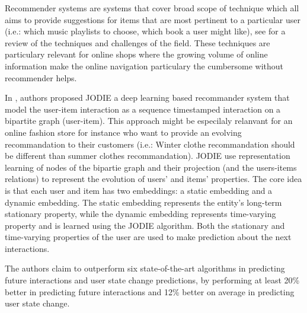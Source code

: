 {\color{red} Recommender systems are systems that cover broad scope of technique which all aims to provide suggestions for items that are most pertinent to a particular user (i.e.: which music playlists to choose, which book a user might like), see \cite{Ricci_Rokach_Shapira_2021} for a review of the techniques and challenges of the field. These techniques are particulary relevant for online shops where the growing volume of online information make the online navigation particulary the cumbersome without recommender helps. 

In \cite{kumar2019predicting}, authors proposed JODIE a deep learning based recommander system that model the user-item interaction as a sequence timestamped interaction on a bipartite graph (user-item). This approach might be especilaly relanvant for an online fashion store for instance who want to provide an evolving recommandation to their customers (i.e.: Winter clothe recommandation should be different than summer clothes recommandation). JODIE use representation learning of nodes of the bipartie graph and their projection (and the users-items relations) to represent the evolution of users’ and items’ properties. The core idea is that each user and item has two embeddings: a static embedding and a dynamic embedding. The static embedding represents the entity’s long-term stationary property, while the dynamic embedding represents time-varying property and is learned using the JODIE algorithm. Both the stationary and time-varying properties of the user are used to make prediction about the next interactions.

The authors claim to outperform six state-of-the-art algorithms in predicting future interactions and user state change predictions, by performing at least 20\% better in predicting future interactions and 12\% better on average in predicting user state change.
}
